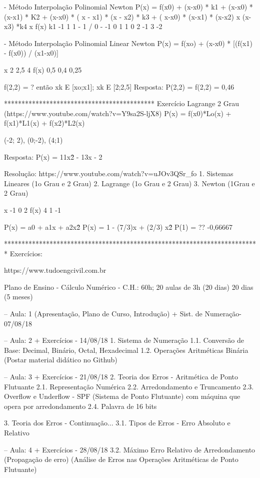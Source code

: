 - Método Interpolação Polinomial Newton
P(x) = f(x0) + (x-x0) * k1 + (x-x0) * (x-x1) * K2 + (x-x0) * ( x - x1) * (x - x2) * k3 + ( x-x0) * (x-x1) * (x-x2) x (x-x3) *k4
x       f(x)    k1
-1      1       1 - 1 / 0 - -1
0       1
1       0
2       -1
3       -2

- Método Interpolação Polinomial Linear Newton
P(x) = f(xo) + (x-x0) * [(f(x1) - f(x0)) / (x1-x0)]

x       2       2,5     4
f(x)    0,5     0,4     0,25

f(2,2) = ? então xk E [xo;x1]; xk E [2;2,5]
Resposta: P(2,2) = f(2,2) = 0,46

******************************************* 
Exercício Lagrange 2 Grau (https://www.youtube.com/watch?v=Y9sa2S-ljX8)
P(x) = f(x0)*Lo(x) + f(x1)*L1(x) + f(x2)*L2(x)

(-2; 2), (0;-2), (4;1)

Resposta: P(x) = 11x\^2 - 13x - 2

Resolução: https://www.youtube.com/watch?v=uJOv3QSr_fo
1. Sistemas Lineares (1o Grau e 2 Grau)
2. Lagrange (1o Grau e 2 Grau)
3. Newton (1Grau e 2 Grau)

x       -1  0    2
f(x)     4  1   -1

P(x) = a0 + a1x + a2x\^2
P(x) = 1 - (7/3)x + (2/3) x\^2
P(1) = ?? -0,66667

*************************************************************************
Exercícios:

https://www.tudoengcivil.com.br

Plano de Ensino - Cálculo Numérico - C.H.: 60h; 20 aulas de 3h (20 dias)
20 dias (5 meses)

-- Aula: 1 (Apresentação, Plano de Curso, Introdução) + Sist. de Numeração-07/08/18

-- Aula: 2 + Exercícios - 14/08/18
1. Sistema de Numeração
1.1. Conversão de Base: Decimal, Binário, Octal, Hexadecimal
1.2. Operações Aritméticas Binária (Postar material didático no Github)

-- Aula: 3 + Exercícios - 21/08/18
2. Teoria dos Erros - Aritmética de Ponto Flutuante
2.1. Representação Numérica
2.2. Arredondamento e Truncamento
2.3. Overflow e Underflow - SPF (Sistema de Ponto Flutuante) com máquina que opera por arredondamento
2.4. Palavra de 16 bits

3. Teoria dos Erros - Continuação...
3.1. Tipos de Erros - Erro Absoluto e Relativo

-- Aula: 4 + Exercícios - 28/08/18
3.2. Máximo Erro Relativo de Arredondamento (Propagação de erro)
(Análise de Erros nas Operações Aritméticas de Ponto Flutuante)


